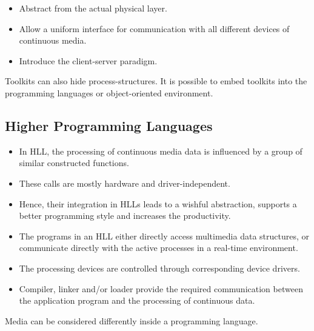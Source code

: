 \begin{itemize}
	\item Abstract from the actual physical layer.
	\item Allow a uniform interface for communication with all different devices of continuous media.
	\item Introduce the client-server paradigm.
\end{itemize}	
	
Toolkits can also hide process-structures. It is possible to embed toolkits into the programming languages or object-oriented environment.
	
\subsection{Higher Programming Languages}

\begin{multicols}{2}
	\begin{itemize}
		\item In HLL, the processing of continuous media data is influenced by a group of similar constructed functions. 
		\item These calls are mostly hardware and driver-independent. 
		\item Hence, their integration in HLLs leads to a wishful abstraction, supports a better programming style and increases the productivity.
		\item The programs in an HLL either directly access multimedia data structures, or communicate directly with the active processes in a real-time environment. 
		\item The processing devices are controlled through corresponding device drivers. 
		\item Compiler, linker and/or loader provide the required communication between the application program and the processing of continuous data. 
	\end{itemize}
\end{multicols}

Media can be considered differently inside a programming language.


